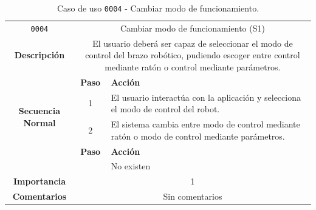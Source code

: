 \begin{table}[H]
    \centering
    \begin{tabularx}{\textwidth}{|c|c|X|}
        \cline{1-3}
        \texttt{0004}                              & \multicolumn{2}{c|}{Cambiar modo de funcionamiento (\ac{S1})}                                                                                                                      \\ \cline{1-3}
        \textbf{Descripción}                       & \multicolumn{2}{m{13cm}|}{El usuario deberá ser capaz de seleccionar el modo de control del brazo robótico, pudiendo escoger entre control mediante ratón o control mediante parámetros. }
        \\ \cline{1-3}
        \multirow{4}{*}{\textbf{Secuencia Normal}} & \textbf{Paso}                                                                                                                                        & \textbf{Acción}
        \\ \cline{2-3}                    &   1  & El usuario interactúa con la aplicación y selecciona el modo de control del robot.
        \\ \cline{2-3}                    &   2  & El sistema cambia entre modo de control mediante ratón o modo de control mediante parámetros.
        \\ \cline{1-3}
        \multirow{2}{*}{\textbf{Excepciones}}      & \textbf{Paso}                                                                                                                                        & \textbf{Acción}
        \\ \cline{2-3}                    &     &  No existen
        \\ \cline{1-3}
        \textbf{Importancia}                       & \multicolumn{2}{c|}{1}                                                                                                                                                 \\ \cline{1-3}
        \textbf{Comentarios}                       & \multicolumn{2}{c|}{Sin comentarios}                                                                                                                                   \\ \cline{1-3}
    \end{tabularx}
    \caption{Caso de uso \texttt{0004} - Cambiar modo de funcionamiento.}
    \label{tab:CU0004}
    \label{tab:caso_de_uso_cambiar_modo_de_funcionamiento}
\end{table}


